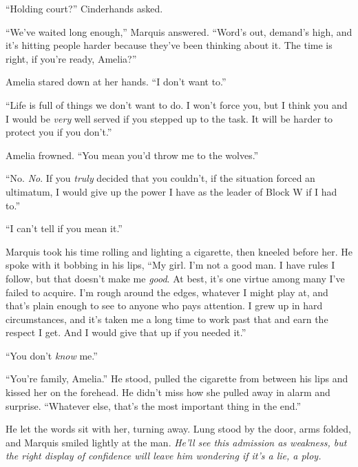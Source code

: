 





``Holding court?''  Cinderhands asked.



``We've waited long enough,'' Marquis answered.  ``Word's out, demand's high, and it's hitting people harder because they've been thinking about it.  The time is right, if you're ready, Amelia?''



Amelia stared down at her hands.  ``I don't want to.''



``Life is full of things we don't want to do.  I won't force you, but I think you and I would be \emph{very} well served if you stepped up to the task.  It will be harder to protect you if you don't.''



Amelia frowned.  ``You mean you'd throw me to the wolves.''



``No.  \emph{No}.  If you \emph{truly} decided that you couldn't, if the situation forced an ultimatum, I would give up the power I have as the leader of Block W if I had to.''



``I can't tell if you mean it.''



Marquis took his time rolling and lighting a cigarette, then kneeled before her.  He spoke with it bobbing in his lips, ``My girl.  I'm not a good man.  I have rules I follow, but that doesn't make me \emph{good}.  At best, it's one virtue among many I've failed to acquire.  I'm rough around the edges, whatever I might play at, and that's plain enough to see to anyone who pays attention.  I grew up in hard circumstances, and it's taken me a long time to work past that and earn the respect I get.  And I would give that up if you needed it.''



``You don't \emph{know} me.''



``You're family, Amelia.''  He stood, pulled the cigarette from between his lips and kissed her on the forehead.  He didn't miss how she pulled away in alarm and surprise.  ``Whatever else, that's the most important thing in the end.''



He let the words sit with her, turning away.  Lung stood by the door, arms folded, and Marquis smiled lightly at the man.  \emph{He'll see this admission as weakness, but the right display of confidence will leave him wondering if it's a lie, a ploy.}



